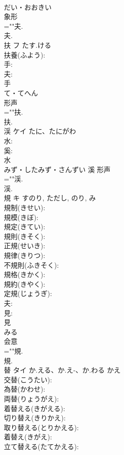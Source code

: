 \documentclass[8pt]{extreport}
\begin{document}
\begin{CJK}{UTF8}{min}
\\	だい・おおきい	
\\	象形 
\\	=""夫.
\\	夫.
\\	扶	フ	たす.ける		
\\	扶養(ふよう): 
\\	手: 
\\	夫: 
\\	手	
\\	て・てへん	
\\	形声 
\\	=""扶.
\\	扶.
\\	渓	ケイ	たに、たにがわ		
\\	水: 
\\	奚: 
\\	水	
\\	みず・したみず・さんずい	溪	形声 
\\	=""渓.
\\	渓.
\\	規	キ		すのり, ただし, のり, み	
\\	規制(きせい): 
\\	規模(きぼ): 
\\	規定(きてい): 
\\	規則(きそく): 
\\	正規(せいき): 
\\	規律(きりつ): 
\\	不規則(ふきそく): 
\\	規格(きかく): 
\\	規約(きやく): 
\\	定規(じょうぎ): 
\\	夫: 
\\	見: 
\\	見	
\\	みる	
\\	会意 
\\	=""規.
\\	規.
\\	替	タイ	か.える、か.え-、か.わる	かえ	
\\	交替(こうたい): 
\\	為替(かわせ): 
\\	両替(りょうがえ): 
\\	着替える(きがえる): 
\\	切り替え(きりかえ): 
\\	取り替える(とりかえる): 
\\	着替え(きがえ): 
\\	立て替える(たてかえる): 

\end{CJK}
\end{document}
